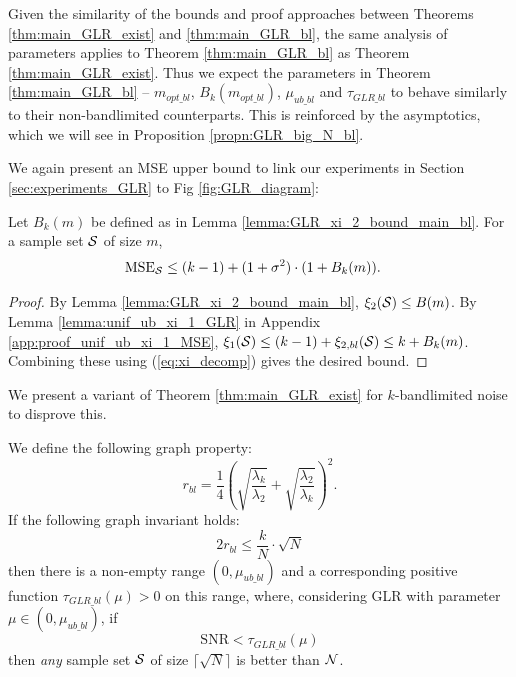 {{Given the similarity of the bounds and proof approaches between Theorems \ref{thm:main_GLR_exist} and \ref{thm:main_GLR_bl}, the same analysis of parameters applies to Theorem \ref{thm:main_GLR_bl} as Theorem \ref{thm:main_GLR_exist}. Thus we expect the parameters in Theorem \ref{thm:main_GLR_bl} -- $m_{opt\_bl}$, $B_{k}(m_{opt\_bl})$, $\mu_{ub\_bl}$ and $\tau_{GLR\_bl}$ to behave similarly to their non-bandlimited counterparts. This is reinforced by the asymptotics, which we will see in Proposition \ref{propn:GLR_big_N_bl}.

We again present an MSE upper bound to link our experiments in Section \ref{sec:experiments_GLR} to Fig \ref{fig:GLR_diagram}:
\begin{corollary}
\label{corr:unif_ub_xi_1_MSE_bl}
    Let $B_{k}(m)$ be defined as in Lemma \ref{lemma:GLR_xi_2_bound_main_bl}. For a sample set $\mathcal{S}$ of size $m$,
    \begin{align}
    \textrm{MSE}_{\mathcal{S}} &\leq (k - 1) + (1 + \sigma^{2}) \cdot (1 + B_{k}(m)). \label{eq:unif_ub_MSE}
    \end{align}
\end{corollary}
\begin{proof}
By Lemma \ref{lemma:GLR_xi_2_bound_main_bl}, $\xi_{2}(\mathcal{S}) \leq B(m)$. By Lemma \ref{lemma:unif_ub_xi_1_GLR} in Appendix \ref{app:proof_unif_ub_xi_1_MSE}, $\xi_{1}(\mathcal{S}) \leq (k-1) + \xi_{2,bl}(\mathcal{S}) \leq k + B_{k}(m)$. Combining these using (\ref{eq:xi_decomp}) gives the desired bound.
\end{proof}
}

\iffalse
We present a variant of Theorem \ref{thm:main_GLR_exist} for $k$-bandlimited noise to disprove this.%

{\color{black}
\begin{propn}
\label{propn:GLR_bl_simple}
We define the following graph property:
    \begin{equation}
        r_{bl}=\frac{1}{4}\left(\sqrt{\frac{\lambda_{k}}{\lambda_{2}}} + \sqrt{\frac{\lambda_{2}}{\lambda_{k}}}\right)^{2}.
    \end{equation}
    If the following graph invariant holds:
    \begin{equation}
        2r_{bl} \leq \frac{k}{N} \cdot \sqrt{N}
    \end{equation}
    then there is a non-empty range $(0,\mu_{ub\_bl})$ and a corresponding positive function $\tau_{GLR\_bl}(\mu) > 0$ on this range, where, considering GLR with parameter $\mu \in (0,\mu_{ub\_bl})$, if
    \begin{equation}
        \text{SNR} < \tau_{GLR\_bl}(\mu)
    \end{equation}
    then \emph{any} sample set $\mathcal{S}$ of size $\lceil\sqrt{N}\rceil$ is better than $\mathcal{N}$.
\end{propn}


}}

